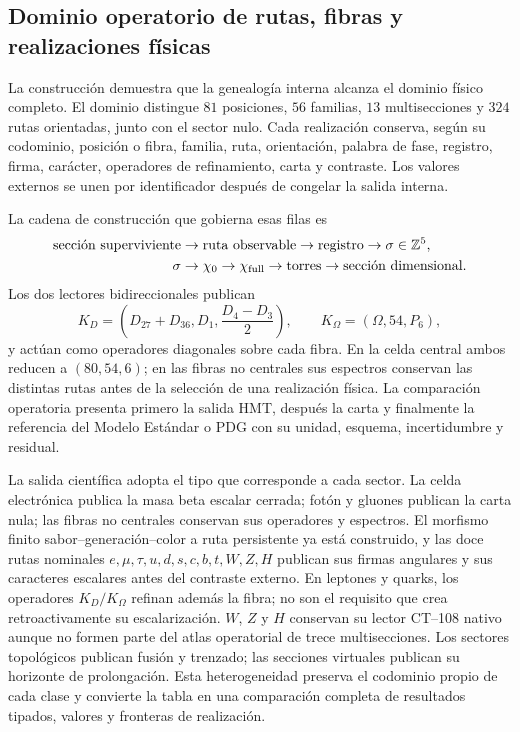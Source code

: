 \subsection*{Dominio operatorio de rutas, fibras y realizaciones físicas}

La construcción demuestra que la genealogía interna alcanza el dominio
físico completo. El dominio distingue
\(81\) posiciones, \(56\) familias, \(13\) multisecciones y \(324\) rutas
orientadas, junto con el sector nulo. Cada realización conserva, según su codominio,
posición o fibra, familia, ruta, orientación, palabra de fase, registro,
firma, carácter, operadores de refinamiento, carta y contraste. Los valores
externos se unen por identificador después de congelar la salida interna.

La cadena de construcción que gobierna esas filas es
\[
 \begin{aligned}
 \text{sección superviviente}&\to\text{ruta observable}
 \to\text{registro}\to\sigma\in\mathbb Z^5,\\
 \sigma&\to\chi_0\to\chi_{\rm full}\to\text{torres}
 \to\text{sección dimensional}.
 \end{aligned}
\]
Los dos lectores bidireccionales publican
\[
 K_D=\left(D_{27}+D_{36},D_1,\frac{D_4-D_3}{2}\right),
 \qquad
 K_\Omega=(\Omega,54,P_6),
\]
y actúan como operadores diagonales sobre cada fibra. En la celda central
ambos reducen a \((80,54,6)\); en las fibras no centrales sus espectros
conservan las distintas rutas antes de la selección de una realización
física. La comparación operatoria presenta primero la salida HMT, después la
carta y finalmente la referencia del Modelo Estándar o PDG con su unidad,
esquema, incertidumbre y residual.

La salida científica adopta el tipo que corresponde a cada sector. La celda
electrónica publica la masa beta escalar cerrada; fotón y gluones publican la
carta nula; las fibras no centrales conservan sus operadores y espectros.
El morfismo finito sabor--generación--color a ruta persistente ya está
construido, y las doce rutas nominales
\(e,\mu,\tau,u,d,s,c,b,t,W,Z,H\) publican sus firmas angulares y sus
caracteres escalares antes del contraste externo. En leptones y quarks, los
operadores \(K_D/K_\Omega\) refinan además la fibra; no son el requisito que
crea retroactivamente su escalarización. \(W\), \(Z\) y \(H\) conservan su
lector CT--108 nativo aunque no formen parte del atlas operatorial de trece
multisecciones. Los sectores topológicos publican fusión y trenzado; las
secciones virtuales publican su horizonte de prolongación. Esta
heterogeneidad preserva el codominio propio de cada clase y convierte la
tabla en una comparación completa de resultados tipados, valores y
fronteras de realización.

